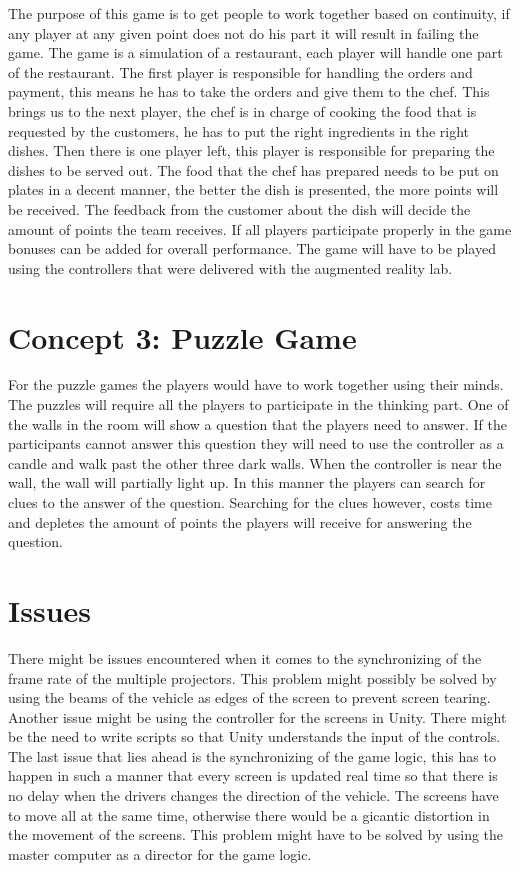 \documentclass[10pt,a4paper]{article}
\begin{document}
The purpose of this game is to get people to work together based on continuity, if any player at any given point does not do his part it will result in failing the game. The game is a simulation of a restaurant, each player will handle one part of the restaurant. The first player is responsible for handling the orders and payment, this means he has to take the orders and give them to the chef. This brings us to the next player, the chef is in charge of cooking the food that is requested by the customers, he has to put the right ingredients in the right dishes. Then there is one player left, this player is responsible for preparing the dishes to be served out. The food that the chef has prepared needs to be put on plates in a decent manner, the better the dish is presented, the more points will be received. The feedback from the customer about the dish will decide the amount of points the team receives. If all players participate properly in the game bonuses can be added for overall performance. The game will have to be played using the controllers that were delivered with the augmented reality lab. 

\section{Concept 3: Puzzle Game}
For the puzzle games the players would have to work together using their minds. The puzzles will require all the players to participate in the thinking part. One of the walls in the room will show a question that the players need to answer. If the participants cannot answer this question they will need to use the controller as a candle and walk past the other three dark walls. When the controller is near the wall, the wall will partially light up. In this manner the players can search for clues to the answer of the question. Searching for the clues however, costs time and depletes the amount of points the players will receive for answering the question.

\section{Issues}
There might be issues encountered when it comes to the synchronizing of the frame rate of the multiple projectors. This problem might possibly be solved by using the beams of the vehicle as edges of the screen to prevent screen tearing. Another issue might be using the controller for the screens in Unity. There might be the need to write scripts so that Unity understands the input of the controls. The last issue that lies ahead is the synchronizing of the game logic, this has to happen in such a manner that every screen is updated real time so that there is no delay when the drivers changes the direction of the vehicle. The screens have to move all at the same time, otherwise there would be a gicantic distortion in the movement of the screens. This problem might have to be solved by using the master computer as a director for the game logic.
\end{document}
